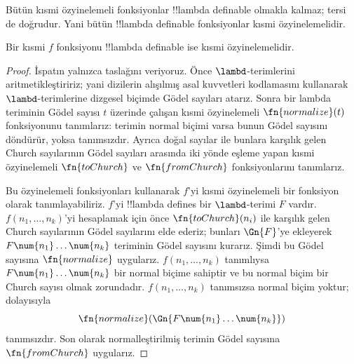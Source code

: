 \documentclass[../../../include/open-logic-section]{subfiles}
\begin{document}

Bütün kısmi özyinelemeli fonksiyonlar !!{lambda definable} olmakla kalmaz;
tersi de doğrudur. Yani bütün !!{lambda definable} fonksiyonlar kısmi
özyinelemelidir.

\begin{thm}
   Bir kısmi $f$ fonksiyonu
  !!{lambda definable} ise kısmi özyinelemelidir.
\end{thm}

\begin{proof}
  İspatın yalnızca taslağını veriyoruz. Önce $\lambd$-terimlerini
  aritmetikleştiririz; yani dizilerin alışılmış asal kuvvetleri kodlamasını
  kullanarak $\lambd$-terimlerine dizgesel biçimde Gödel sayıları atarız.
  Sonra bir lambda teriminin Gödel sayısı $t$ üzerinde çalışan kısmi
  özyinelemeli $\fn{normalize}(t)$ fonksiyonunu tanımlarız: terimin normal
  biçimi varsa bunun Gödel sayısını döndürür, yoksa tanımsızdır. Ayrıca doğal
  sayılar ile bunlara karşılık gelen Church sayılarının Gödel sayıları
  arasında iki yönde eşleme yapan kısmi özyinelemeli $\fn{toChurch}$ ve
  $\fn{fromChurch}$ fonksiyonlarını tanımlarız.

  Bu özyinelemeli fonksiyonları kullanarak $f$'yi kısmi özyinelemeli bir
  fonksiyon olarak tanımlayabiliriz. $f$'yi !!{lambda define}s bir
  $\lambd$-terimi $F$ vardır. $f(n_1,\dots,n_k)$'yi hesaplamak için önce
  $\fn{toChurch}(n_i)$ ile karşılık gelen Church sayılarının Gödel sayılarını
  elde ederiz; bunları $\Gn{F}$'ye ekleyerek
  $F\num{n_1}\dots\num{n_k}$ teriminin Gödel sayısını kurarız. Şimdi bu
  Gödel sayısına $\fn{normalize}$ uygularız. $f(n_1,\dots,n_k)$ tanımlıysa
  $F\num{n_1}\dots\num{n_k}$ bir normal biçime sahiptir ve bu normal biçim
  bir Church sayısı olmak zorundadır. $f(n_1,\dots,n_k)$ tanımsızsa normal
  biçim yoktur; dolayısıyla
  \[
  \fn{normalize}(\Gn{F\num{n_1}\dots\num{n_k}})
  \]
  tanımsızdır. Son olarak normalleştirilmiş terimin Gödel sayısına
  $\fn{fromChurch}$ uygularız.
\end{proof}
\end{document}

